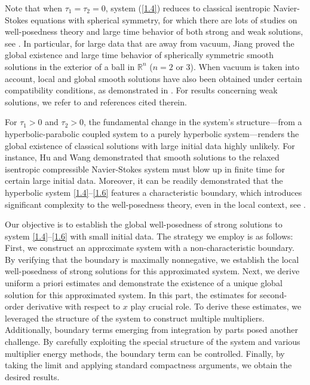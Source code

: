 \documentclass[10pt,reqno]{amsart}
\numberwithin{equation}{section}
\begin{document}
	Note that when $\tau_1=\tau_2=0$, system (\ref{1.4}) reduces to classical isentropic Navier-Stokes equations with spherical symmetry, for which there are lots of studies on well-posedness theory and large time behavior of both strong and weak solutions,  see \cite{jiang1996global, ding2012global, Cho-Kim}. 
	In particular, for large data that are away from vacuum, Jiang \cite{jiang1996global} proved the global existence and large time behavior of spherically symmetric smooth solutions  in the exterior of a ball in $\mathbb{R}^n$ (\(n = 2\) or 3). When vacuum is taken into account, local and global smooth solutions have also been obtained under certain compatibility conditions, as demonstrated in \cite{ding2012global, Cho-Kim}.  For results concerning weak solutions, we refer to \cite{feireisl2004dynamics,hoff1992spherically,jiang2001spherically,lions1998mathematical,makino1994initial} and references cited therein.
	
	For \(\tau_1 > 0\) and \(\tau_2 > 0\), the fundamental change in the system's structure—from a hyperbolic-parabolic coupled system to a purely hyperbolic system—renders the global existence of classical solutions with large initial data highly unlikely. For instance, Hu and Wang \cite{HWAML} demonstrated that smooth solutions to the relaxed isentropic compressible Navier-Stokes system must blow up in finite time for certain large initial data. Moreover, it can be readily demonstrated that the hyperbolic system \eqref{1.4}–\eqref{1.6} features a characteristic boundary, which introduces significant complexity to the well-posedness theory, even in the local context, see \cite{Chen2007,schochet1986compressible}. 
	
	Our objective is to establish the global well-posedness of strong solutions to system \eqref{1.4}–\eqref{1.6} with small initial data. The strategy we employ is as follows: First, we construct an approximate system with a non-characteristic boundary. By verifying that the boundary is maximally nonnegative, we establish the local well-posedness of strong solutions for this approximated system. Next, we derive uniform a priori estimates and demonstrate the existence of a unique global solution for this approximated system. In this part, the estimates for second-order derivative with respect to $x$ play crucial role. To derive these estimates, we leveraged the structure of the system to construct multiple multipliers. Additionally, boundary terms emerging from integration by parts posed another  challenge. By carefully exploiting the special structure of the system and various multiplier energy methods, the boundary term can be controlled.  Finally, by taking the limit and applying standard compactness arguments, we obtain the desired results.
	
\end{document}
